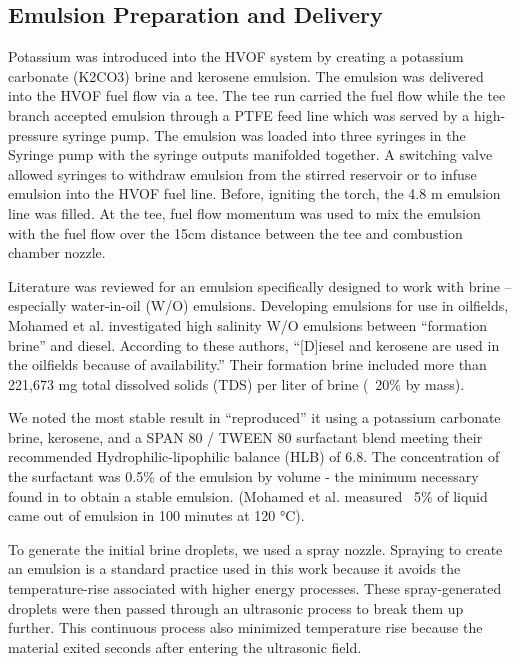 \clearpage
\subsection{Emulsion Preparation and Delivery}

Potassium was introduced into the HVOF system by creating a potassium carbonate (K2CO3) brine and kerosene emulsion. The emulsion was delivered into the HVOF fuel flow via a tee. The tee run carried the fuel flow while the tee branch accepted emulsion through a PTFE feed line which was served by a high-pressure syringe pump. The emulsion was loaded into three syringes in the Syringe pump with the syringe outputs manifolded together. A switching valve allowed syringes to withdraw emulsion from the stirred reservoir or to infuse emulsion into the HVOF fuel line. Before, igniting the torch, the 4.8 m emulsion line was filled. At the tee, fuel flow momentum was used to mix the emulsion with the fuel flow over the 15cm distance between the tee and combustion chamber nozzle. 

Literature was reviewed for an emulsion specifically designed to work with brine – especially water-in-oil (W/O) emulsions.  Developing emulsions for use in oilfields, Mohamed et al.\cite{mohamedInfluenceSurfactantStructure2017a} investigated high salinity W/O emulsions between “formation brine” and diesel. According to these authors, “[D]iesel and kerosene are used in the oilfields because of availability.” Their formation brine included more than 221,673 mg total dissolved solids (TDS) per liter of brine (~20\% by mass).  

We noted the most stable result in \cite{mohamedInfluenceSurfactantStructure2017a} “reproduced” it using a potassium carbonate brine, kerosene, and a SPAN 80 / TWEEN 80 surfactant blend meeting their recommended Hydrophilic-lipophilic balance (HLB) of 6.8. The concentration of the surfactant was 0.5\% of the emulsion by volume - the minimum necessary found in \cite{mohamedInfluenceSurfactantStructure2017a} to obtain a stable emulsion. (Mohamed et al. measured ~5\% of liquid came out of emulsion in 100 minutes at 120 °C).  

To generate the initial brine droplets, we used a spray nozzle. Spraying to create an emulsion is a standard practice \cite{atkinsonKeroseneEmulsionHow1890} used in this work because it avoids the temperature-rise associated with higher energy processes. These spray-generated droplets were then passed through an ultrasonic process to break them up further. This continuous process also minimized temperature rise because the material exited seconds after entering the ultrasonic field. 

